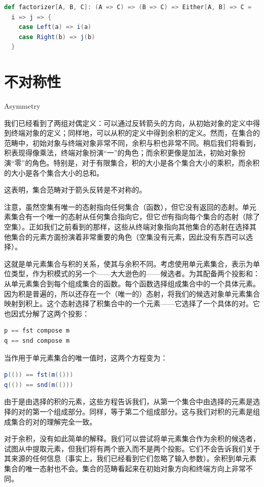 \begin{lstlisting}[language=Scala]
def factorizer[A, B, C]: (A => C) => (B => C) => Either[A, B] => C =
  i => j => {
    case Left(a) => i(a)
    case Right(b) => j(b)
  }
\end{lstlisting}

\section{不对称性}{Asymmetry}

我们已经看到了两组对偶定义：可以通过反转箭头的方向，从初始对象的定义中得到终端对象的定义；同样地，可以从积的定义中得到余积的定义。然而，在集合的范畴中，初始对象与终端对象非常不同，余积与积也非常不同。稍后我们将看到，积表现得像乘法，终端对象扮演“一”的角色；而余积更像是加法，初始对象扮演“零”的角色。特别是，对于有限集合，积的大小是各个集合大小的乘积，而余积的大小是各个集合大小的总和。

这表明，集合范畴对于箭头反转是不对称的。

注意，虽然空集有唯一的态射指向任何集合（函数），但它没有返回的态射。单元素集合有一个唯一的态射从任何集合指向它，但它\emph{也}有指向每个集合的态射（除了空集）。正如我们之前看到的那样，这些从终端对象指向其他集合的态射在选择其他集合的元素方面扮演着非常重要的角色（空集没有元素，因此没有东西可以选择）。

这就是单元素集合与积的关系，使其与余积不同。考虑使用单元素集合，表示为单位类型\code{()}，作为积模式的另一个——大大逊色的——候选者。为其配备两个投影和：从单元素集合到每个组成集合的函数。每个函数选择组成集合中的一个具体元素。因为积是普遍的，所以还存在一个（唯一的）态射，将我们的候选对象单元素集合映射到积上。这个态射选择了积集合中的一个元素——它选择了一个具体的对。它也因式分解了这两个投影：

\begin{lstlisting}[language=Scala]
p == fst compose m
q == snd compose m
\end{lstlisting}
当作用于单元素集合的唯一值\code{()}时，这两个方程变为：

\begin{lstlisting}[language=Scala]
p(()) == fst(m(()))
q(()) == snd(m(()))
\end{lstlisting}
由于是由选择的积的元素，这些方程告诉我们，从第一个集合中由选择的元素是选择的对的第一个组成部分。同样，等于第二个组成部分。这与我们对积的元素是组成集合的对的理解完全一致。

对于余积，没有如此简单的解释。我们可以尝试将单元素集合作为余积的候选者，试图从中提取元素，但我们将有两个嵌入而不是两个投影。它们不会告诉我们关于其来源的任何信息（事实上，我们已经看到它们忽略了输入参数）。余积到单元素集合的唯一态射也不会。集合的范畴看起来在初始对象方向和终端方向上非常不同。

